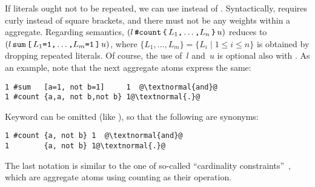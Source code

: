 If literals ought not to be repeated,
we can use  instead of .
Syntactically,  requires curly instead of square
brackets, and there must not be any weights within a  aggregate.
Regarding semantics,
$(
  l\,
  \const{\#count} 
  \,
  \code{\char`\{}
  \,
  L_1\code{,}
  \dots\code{,}
  L_n
  \,
  \code{\char`\}}
  \,
  u
)$ 
reduces to
$(
  l\,
  \texttt{sum}
  \,
  \texttt{[}
  \,
  L_1\texttt{=}\texttt{1}\texttt{,}
  \dots\texttt{,}
  L_m\texttt{=}\texttt{1}
  \,
  \texttt{]}
  \,
  u
)$,
where $\{L_1,\dots,L_m\}=\{L_i \mid 1\leq i\leq n\}$ is obtained by dropping
repeated literals.
Of course, the use of~$l$ and~$u$ is optional also with .
As an example, note that the next aggregate atoms express the same:
\begin{lstlisting}[numbers=none,escapechar=@]
1 #sum   [a=1, not b=1]     1  @\textnormal{and}@ 
1 #count {a,a, not b,not b} 1@\textnormal{.}@  
\end{lstlisting}
Keyword  can be omitted (like ),
so that the following are synonyms:
\begin{lstlisting}[numbers=none,escapechar=@]
1 #count {a, not b} 1  @\textnormal{and}@ 
1        {a, not b} 1@\textnormal{.}@  
\end{lstlisting}
The last notation is similar to the one of so-called
``cardinality constraints''~\cite{siniso02a,lparseManual},
which are aggregate atoms using counting as their operation.

